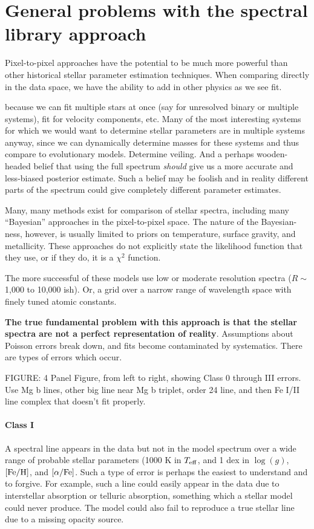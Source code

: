 \documentclass[preprint]{aastex} %
\newcommand{\Z}{[{\rm Fe}/{\rm H}]}
\newcommand{\A}{[\alpha/{\rm Fe}]}
\begin{document}
\section{General problems with the spectral library approach}

Pixel-to-pixel approaches have the potential to be much more powerful than other historical stellar parameter estimation techniques. When comparing directly in the data space, we have the ability to add in other physics as we see fit. 

because we can fit multiple stars at once (say for unresolved binary or multiple systems), fit for velocity components, etc. Many of the most interesting systems for which we would want to determine stellar parameters are in multiple systems anyway, since we can dynamically determine masses for these systems and thus compare to evolutionary models. Determine veiling. And a perhaps wooden-headed belief that using the full spectrum \emph{should} give us a more accurate and less-biased posterior estimate. Such a belief may be foolish and in reality different parts of the spectrum could give completely different parameter estimates.

Many, many methods exist for comparison of stellar spectra, including many ``Bayesian'' approaches in the pixel-to-pixel space. The nature of the Bayesian-ness, however, is usually limited to priors on temperature, surface gravity, and metallicity. These approaches do not explicitly state the likelihood function that they use, or if they do, it is a $\chi^2$ function. 


The more successful of these models use low or moderate resolution spectra ($R \sim$ 1,000 to 10,000 ish). Or, a grid over a narrow range of wavelength space with finely tuned atomic constants.

\textbf{The true fundamental problem with this approach is that the stellar spectra are not a perfect representation of reality}. Assumptions about Poisson errors break down, and fits become contaminated by systematics. There are types of errors which occur.

FIGURE: 4 Panel Figure, from left to right, showing Class 0 through III errors. Use Mg b lines, other big line near Mg b triplet, order 24 line, and then Fe I/II line complex that doesn't fit properly.

\paragraph{Class I} A spectral line appears in the data but not in the model spectrum over a wide range of probable stellar parameters (1000 K in $T_{\rm eff}$, and 1 dex in $\log(g)$, $\Z$, and $\A$. Such a type of error is perhaps the easiest to understand and to forgive. For example, such a line could easily appear in the data due to interstellar absorption or telluric absorption, something which a stellar model could never produce. The model could also fail to reproduce a true stellar line due to a missing opacity source.
\end{document}
